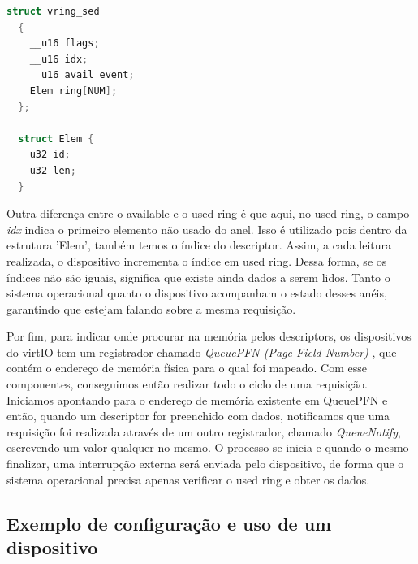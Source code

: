 \begin{lstlisting}[language=C]
  struct vring_sed
  {
    __u16 flags;
    __u16 idx;
    __u16 avail_event;
    Elem ring[NUM];
  };

  struct Elem {
    u32 id;
    u32 len;
  }
\end{lstlisting}


Outra diferença entre o available e o used ring é que aqui, no used ring, o campo \emph{idx} indica o primeiro elemento não usado do anel.
Isso é utilizado pois dentro da estrutura 'Elem', também temos o índice do descriptor. Assim, a cada leitura realizada, o dispositivo incrementa o índice em used ring.
Dessa forma, se os índices não são iguais, significa que existe ainda dados a serem lidos. 	Tanto o sistema operacional quanto o dispositivo acompanham o estado desses anéis, garantindo que estejam falando sobre a mesma requisição.


Por fim, para indicar onde procurar na memória pelos descriptors, os dispositivos do virtIO tem um registrador chamado \emph{QueuePFN (Page Field Number)} , que contém o endereço de memória física para o qual foi mapeado. Com esse componentes, conseguimos então realizar todo o ciclo de uma requisição. Iniciamos apontando para o endereço de memória existente em QueuePFN e então, quando um descriptor for preenchido com dados, notificamos que uma requisição foi realizada através de um outro registrador, chamado \emph{QueueNotify}, escrevendo um valor qualquer no mesmo. O processo se inicia e quando o mesmo finalizar, uma interrupção externa será enviada pelo dispositivo, de forma que o sistema operacional precisa apenas verificar o used ring e obter os dados.


\subsection{Exemplo de configuração e uso de um dispositivo}